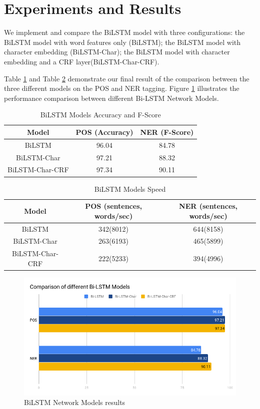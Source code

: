 \documentclass{sfuthesis}
\begin{document}
 
\section{Experiments and Results}

We implement and compare the BiLSTM model with three configurations: the BiLSTM model with word features only (BiLSTM); the BiLSTM model with character embedding (BiLSTM-Char); the BiLSTM model with character embedding and a CRF layer(BiLSTM-Char-CRF).

Table \ref{table:lstm-table1} and Table \ref{table:lstm-table2} demonstrate our final result of the comparison between the three different models on the POS and NER tagging. Figure \ref{fig:lstm} illustrates the performance comparison between different Bi-LSTM Network Models.

\begin{table}[]
\centering
\caption{BiLSTM Models Accuracy and F-Score}
\label{table:lstm-table1}
\begin{tabular}{|c|c|c|}
\hline
Model         & POS (Accuracy)  & NER (F-Score)       \\ \hline
BiLSTM  & 96.04     & 84.78                             \\ \hline
BiLSTM-Char & 97.21 & 88.32             \\ \hline
BiLSTM-Char-CRF & 97.34  & 90.11             \\ \hline
\end{tabular}
\end{table}

\begin{table}[]
\centering
\caption{BiLSTM Models Speed}
\label{table:lstm-table2}
\begin{tabular}{|c|c|c|}
\hline
Model       & POS  (sentences, words/sec)  & NER  (sentences, words/sec)      \\ \hline
BiLSTM             & 342(8012)     & 644(8158)       \\ \hline
BiLSTM-Char        & 263(6193)  & 465(5899)             \\ \hline
BiLSTM-Char-CRF    & 222(5233)  & 394(4996)         \\ \hline
\end{tabular}
\end{table}

\begin{figure}
  \centering
  \includegraphics[scale=0.6]{lstm.png}
 \caption{BiLSTM Network Models results}
  \label{fig:lstm}
\end{figure}
\end{document}
